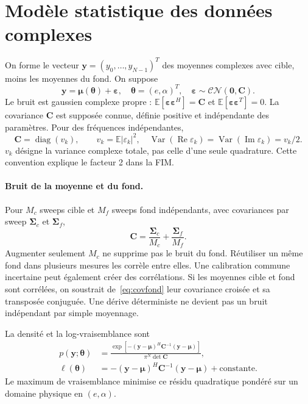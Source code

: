\documentclass[11pt,a4paper]{article}
\newcommand{\E}{\mathbb{E}}
\newcommand{\Reel}{\operatorname{Re}}
\newcommand{\Var}{\operatorname{Var}}
\newcommand{\CN}{\mathcal{CN}}
\begin{document}
\section{Modèle statistique des données complexes}

On forme le vecteur $\mathbf y=(y_0,\ldots,y_{N-1})^T$ des moyennes
complexes avec cible, moins les moyennes du fond. On suppose
\begin{equation}\label{eq:stat}
 \boxed{\mathbf y=\boldsymbol\mu(\boldsymbol\theta)+\boldsymbol\varepsilon,
 \quad \boldsymbol\theta=(e,\alpha)^T,\quad
 \boldsymbol\varepsilon\sim\CN(\mathbf0,\mathbf C).}
\end{equation}
Le bruit est gaussien complexe propre :
$\E[\boldsymbol\varepsilon\boldsymbol\varepsilon^H]=\mathbf C$ et
$\E[\boldsymbol\varepsilon\boldsymbol\varepsilon^T]=0$.
La covariance $\mathbf C$ est supposée connue, définie positive et
indépendante des paramètres. Pour des fréquences indépendantes,
\begin{equation}\label{eq:variance}
 \mathbf C=\operatorname{diag}(v_k),\qquad v_k=\E|\varepsilon_k|^2,
 \quad \Var(\Reel\varepsilon_k)=\Var(\operatorname{Im}\varepsilon_k)=v_k/2.
\end{equation}
$v_k$ désigne la variance complexe totale, pas celle d'une seule quadrature.
Cette convention explique le facteur 2 dans la FIM.

\paragraph{Bruit de la moyenne et du fond.}
Pour $M_c$ sweeps cible et $M_f$ sweeps fond indépendants, avec covariances
par sweep $\boldsymbol\Sigma_c$ et $\boldsymbol\Sigma_f$,
\begin{equation}\label{eq:covfond}
 \mathbf C=\frac{\boldsymbol\Sigma_c}{M_c}
          +\frac{\boldsymbol\Sigma_f}{M_f}.
\end{equation}
Augmenter seulement $M_c$ ne supprime pas le bruit du fond. Réutiliser un
même fond dans plusieurs mesures les corrèle entre elles. Une calibration
commune incertaine peut également créer des corrélations. Si les moyennes
cible et fond sont corrélées, on soustrait de~\eqref{eq:covfond} leur
covariance croisée et sa transposée conjuguée. Une dérive déterministe
ne devient pas un bruit indépendant par simple moyennage.

La densité et la log-vraisemblance sont
\begin{align}
 p(\mathbf y;\boldsymbol\theta)&=
 \frac{\exp[-(\mathbf y-\boldsymbol\mu)^H\mathbf C^{-1}
 (\mathbf y-\boldsymbol\mu)]}{\pi^N\det\mathbf C},\\
 \ell(\boldsymbol\theta)&=-(\mathbf y-\boldsymbol\mu)^H\mathbf C^{-1}
 (\mathbf y-\boldsymbol\mu)+\text{constante}.
\end{align}
Le maximum de vraisemblance minimise ce résidu quadratique pondéré
sur un domaine physique en $(e,\alpha)$.
\end{document}
